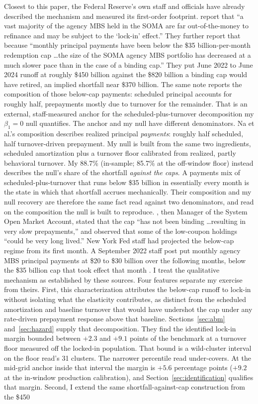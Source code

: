 \documentclass[12pt]{article}
\begin{document}
Closest to this paper, the Federal Reserve's own staff and officials have already described the mechanism and measured its first-order footprint. \citet{na2024} report that ``a vast majority of the agency MBS held in the SOMA are far out-of-the-money to refinance and may be subject to the `lock-in' effect.'' They further report that because ``monthly principal payments have been below the \$35 billion-per-month redemption cap \ldots the size of the SOMA agency MBS portfolio has decreased at a much slower pace than in the case of a binding cap.'' They put June 2022 to June 2024 runoff at roughly \$450 billion against the \$820 billion a binding cap would have retired, an implied shortfall near \$370 billion. The same note reports the composition of those below-cap payments: scheduled principal accounts for roughly half, prepayments mostly due to turnover for the remainder. That is an external, staff-measured anchor for the scheduled-plus-turnover decomposition my $\beta_1 = 0$ null quantifies. The anchor and my null have different denominators. Na et al.'s composition describes realized principal \emph{payments}: roughly half scheduled, half turnover-driven prepayment. My null is built from the same two ingredients, scheduled amortization plus a turnover floor calibrated from realized, partly behavioral turnover. My 88.7\% (in-sample; 85.7\% at the off-window floor) instead describes the null's share of the shortfall \emph{against the caps}. A payments mix of scheduled-plus-turnover that runs below \$35 billion in essentially every month is the state in which that shortfall accrues mechanically. Their composition and my null recovery are therefore the same fact read against two denominators, and read on the composition the null is built to reproduce. \citet{perli2024}, then Manager of the System Open Market Account, stated that the cap ``has not been binding \ldots resulting in very slow prepayments,'' and \citet{hammack2025} observed that some of the low-coupon holdings ``could be very long lived.'' New York Fed staff had projected the below-cap regime from its first month. A September 2022 staff post put monthly agency MBS principal payments at \$20 to \$30 billion over the following months, below the \$35 billion cap that took effect that month \citep{nyfed2022}. I treat the qualitative mechanism as established by these sources. Four features separate my exercise from theirs. First, this characterization attributes the below-cap runoff to lock-in without isolating what the elasticity contributes, as distinct from the scheduled amortization and baseline turnover that would have undershot the cap under any rate-driven prepayment response above that baseline. Sections~\ref{sec:abm} and~\ref{sec:hazard} supply that decomposition. They find the identified lock-in margin bounded between $+2.3$ and $+9.1$ points of the benchmark at a turnover floor measured off the locked-in population. That bound is a wild-cluster interval on the floor read's 31 clusters. The narrower percentile read under-covers. At the mid-grid anchor inside that interval the margin is $+5.6$ percentage points ($+9.2$ at the in-window production calibration), and Section~\ref{sec:identification} qualifies that margin. Second, I extend the same shortfall-against-cap construction from the \$450 
\end{document}
